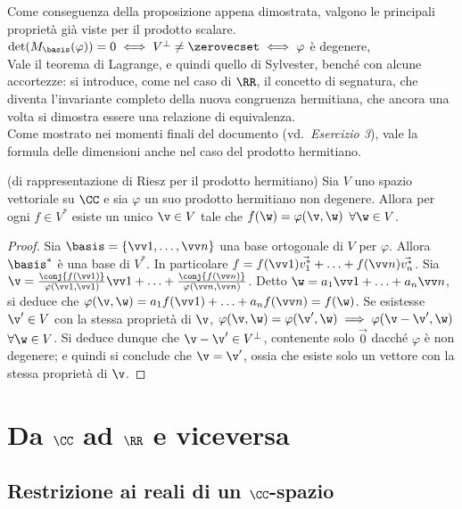 \begin{remark}
	Come conseguenza della proposizione appena dimostrata, valgono
	le principali proprietà già viste per il prodotto scalare. \\
	
	\li $\det(M_\basis(\varphi)) = 0 \iff V^\perp \neq \zerovecset \iff \varphi$ è degenere, \\
	\li Vale il teorema di Lagrange, e quindi quello di Sylvester, benché con alcune accortezze: si
	introduce, come nel caso di $\RR$, il concetto di segnatura, che diventa l'invariante completo
	della nuova congruenza hermitiana, che ancora una volta si dimostra essere una relazione
	di equivalenza. \\
	\li Come mostrato nei momenti finali del documento (vd.~\textit{Esercizio 3}), vale
	la formula delle dimensioni anche nel caso del prodotto hermitiano.
\end{remark}

\begin{theorem} (di rappresentazione di Riesz per il prodotto hermitiano)
	Sia $V$ uno spazio vettoriale su $\CC$ e sia $\varphi$ un suo prodotto hermitiano non
	degenere. Allora per ogni $f \in V^*$ esiste un unico $\v \in V$ tale che
	$f(\w) = \varphi(\v, \w)$ $\forall \w \in V$.
\end{theorem}

\begin{proof}
	Sia $\basis = \{ \vv 1, \ldots, \vv n \}$ una base ortogonale di $V$ per $\varphi$. Allora $\basis^*$ è una base di $V^*$. In
	particolare $f = f(\vv 1) \vec{v_1^*} + \ldots + f(\vv n) \vec{v_n^*}$. Sia $\v = \frac{\conj{f(\vv 1)}}{\varphi(\vv 1, \vv 1)} \vv 1 + \ldots + \frac{\conj{f(\vv n)}}{\varphi(\vv n, \vv n)}$. Detto $\w = a_1 \vv 1 + \ldots + a_n \vv n$,
	si deduce che $\varphi(\v, \w) = a_1 f(\vv 1) + \ldots + a_n f(\vv n) = f(\w)$. Se esistesse $\v' \in V$ con
	la stessa proprietà di $\v$, $\varphi(\v, \w) = \varphi(\v', \w) \implies \varphi(\v - \v', \w)$ $\forall \w \in V$. Si deduce dunque che $\v - \v' \in V^\perp$, contenente solo $\vec 0$ dacché $\varphi$ è non degenere;
	e quindi si conclude che $\v = \v'$, ossia che esiste solo un vettore con la stessa proprietà di $\v$.
\end{proof}

\section{Da $\CC$ ad $\RR$ e viceversa}

\subsection{Restrizione ai reali di un $\CC$-spazio}

